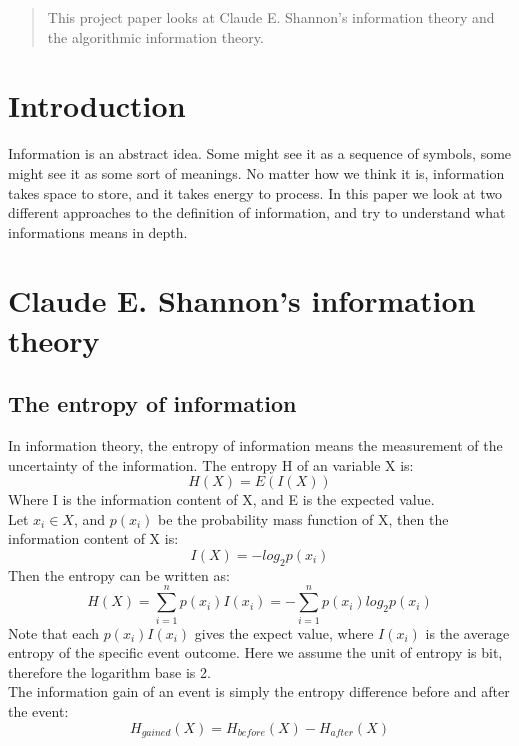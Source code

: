 \documentclass[12pt]{article}
\begin{document}
\maketitle

\begin{abstract}
This project paper looks at Claude E. Shannon's information theory and the algorithmic information theory.
\end{abstract}

\section{Introduction}
Information is an abstract idea. Some might see it as a sequence of symbols, some might see it as some sort of meanings. No matter how we think it is, information takes space to store, and it takes energy to process. In this paper we look at two different approaches to the definition of information, and try to understand what informations means in depth.

\section{Claude E. Shannon's information theory}

\subsection{The entropy of information}
In information theory, the entropy of information means the measurement of the uncertainty of the information. The entropy H of an variable X is:
\[
	H(X) = E(I(X))
\]
Where I is the information content of X, and E is the expected value.\\
Let $x_i \in X$, and $p(x_i)$ be the probability mass function of X, then the information content of X is:
\[
	I(X) = -log_{2}p(x_i)
\]
Then the entropy can be written as\cite{reza94}:
\[
	H(X) = \sum_{i=1}^{n}p(x_i)I(x_i) = -\sum_{i=1}^{n}p(x_i)log_{2}p(x_i)
\]
Note that each $p(x_i)I(x_i)$ gives the expect value, where $I(x_i)$ is the average entropy of the specific event outcome. Here we assume the unit of entropy is bit, therefore the logarithm base is 2.\\

The information gain of an event is simply the entropy difference before and after the event:
\[
	H_{gained}(X) = H_{before}(X) - H_{after}(X)
\]
\end{document}
